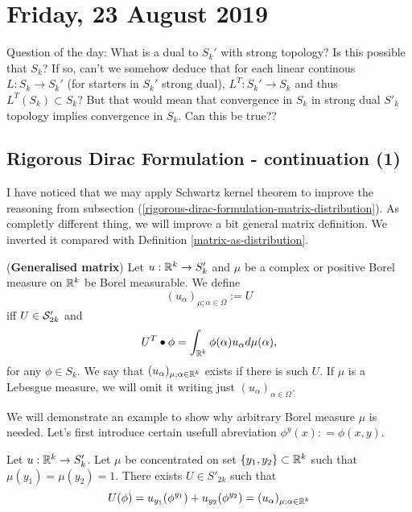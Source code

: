 \documentclass[main.tex]{subfiles}
\begin{document}
\section{Friday, 23 August 2019}
Question of the day: What is a dual to $S_k'$ with strong topology? Is this possible that $S_k$? If so, can't we somehow deduce that for each linear continous $L:S_k\to S_k'$ (for starters in $S_k'$ strong dual), $L^T:S_k'\to S_k$ and thus $L^T(S_k)\subset S_k$? But that would mean that convergence in $S_k$ in strong dual $S'_k$ topology implies convergence in $S_k$. Can this be true??
\subsection{Rigorous Dirac Formulation - continuation (1)}
\label{f7h3480}
I have noticed that we may apply Schwartz kernel theorem to improve the reasoning from subsection (\ref{rigorous-dirac-formulation-matrix-distribution}).
As completly different thing, we will improve a bit general matrix definition. We inverted it compared with Definition \ref{matrix-as-distribution}.
\begin{definition} (\textbf{Generalised matrix})
\label{generalised-matrix}
\label{rigorous-dirac-formulation-matrix-distribution2}
Let $u:\R^k\to S_k'$ and $\mu$ be a complex or positive Borel measure on $\R^k$ 
be Borel measurable. We define
\begin{equation}
(u_\alpha)_{\mu; \alpha\in\Omega} := U
\end{equation}
iff $U\in\S'_{2k}$ and
\begin{equation}
U^T \bullet \phi = \int_{\R^k} \phi(\alpha) u_\alpha d\mu(\alpha),
\end{equation}
for any $\phi\in S_k$.
We say that $(u_\alpha)_{\mu; \alpha\in\R^k}$ exists if there is such $U$. If $\mu$ is a Lebesgue measure, we will omit it writing just $(u_\alpha)_{\alpha\in\Omega}$.
\end{definition}
We will demonstrate an example to show why arbitrary Borel measure $\mu$ is needed. Let's first introduce certain usefull abreviation $\phi^y(x): = \phi(x,y)$.
\begin{example}
Let $u:\R^k\to S_k'$. Let $\mu$ be concentrated on set $\{y_1,y_2\}\subset \R^k$ such that $\mu(y_1)=\mu(y_2)=1$. There exists $U\in S'_{2k}$ such that 
\begin{equation}
U(\phi) = u_{y_1}(\phi^{y_1}) + u_{y_2}(\phi^{y_2}) = (u_\alpha)_{\mu;\alpha\in\R^k}
\end{equation}
\end{example}
\end{document}

